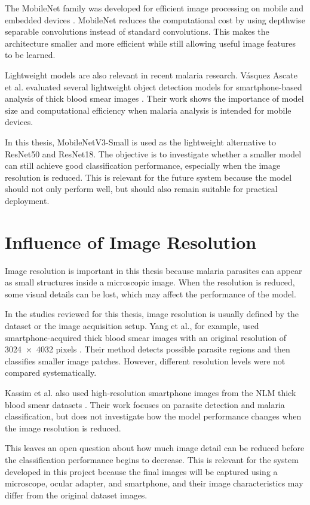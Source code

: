 The MobileNet family was developed for efficient image processing on mobile and embedded devices \cite{Howard2017}. MobileNet reduces the computational cost by using depthwise separable convolutions instead of standard convolutions. This makes the architecture smaller and more efficient while still allowing useful image features to be learned.

Lightweight models are also relevant in recent malaria research. Vásquez Ascate et al. evaluated several lightweight object detection models for smartphone-based analysis of thick blood smear images \cite{VasquezAscate2026}. Their work shows the importance of model size and computational efficiency when malaria analysis is intended for mobile devices.

In this thesis, MobileNetV3-Small is used as the lightweight alternative to ResNet50 and ResNet18. The objective is to investigate whether a smaller model can still achieve good classification performance, especially when the image resolution is reduced. This is relevant for the future system because the model should not only perform well, but should also remain suitable for practical deployment.

\section{Influence of Image Resolution}
\label{sec:image_resolution}

Image resolution is important in this thesis because malaria parasites can appear as small structures inside a microscopic image. When the resolution is reduced, some visual details can be lost, which may affect the performance of the model.

In the studies reviewed for this thesis, image resolution is usually defined by the dataset or the image acquisition setup. Yang et al., for example, used smartphone-acquired thick blood smear images with an original resolution of 3024~$\times$~4032 pixels \cite{Yang2020}. Their method detects possible parasite regions and then classifies smaller image patches. However, different resolution levels were not compared systematically.

Kassim et al. also used high-resolution smartphone images from the NLM thick blood smear datasets \cite{Kassim2021}. Their work focuses on parasite detection and malaria classification, but does not investigate how the model performance changes when the image resolution is reduced.

This leaves an open question about how much image detail can be reduced before the classification performance begins to decrease. This is relevant for the system developed in this project because the final images will be captured using a microscope, ocular adapter, and smartphone, and their image characteristics may differ from the original dataset images.

